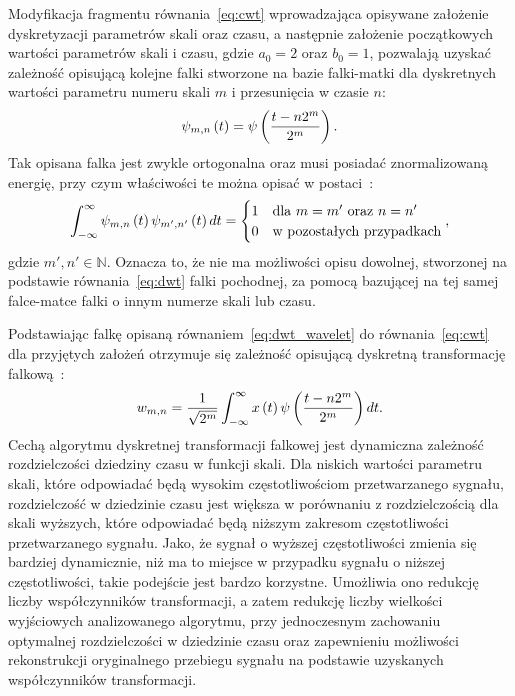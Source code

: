 Modyfikacja fragmentu równania~\eqref{eq:cwt} wprowadzająca opisywane założenie dyskretyzacji parametrów skali oraz czasu, a następnie założenie początkowych wartości parametrów skali i czasu, gdzie $a_{0} = 2$ oraz $b_{0} = 1$, pozwalają uzyskać zależność opisującą kolejne falki stworzone na bazie falki-matki dla dyskretnych wartości parametru numeru skali $m$ i przesunięcia w czasie $n$:
\begin{equation}
\psi_{m,n} \left(t\right) = \psi \left(\frac{t - n 2^{m}}{2^{m}}\right) \label{eq:dwt_wavelet}.
\end{equation}
Tak opisana falka jest zwykle ortogonalna oraz musi posiadać znormalizowaną energię, przy czym właściwości te można opisać w postaci~\cite{wallen_handbook}:
\begin{equation}
\int _{-\infty} ^{\infty} \psi_{m,n} \emb{t} \psi_{m',n'} \emb{t} dt =
\begin{cases}
	1 & $dla $ m = m' $ oraz $ n = n' \\
	0 & $w pozostałych przypadkach$
\end{cases}
\label{eq:dwt_orthogonal_mather},
\end{equation}
gdzie $m', n' \in \mathbb{N}$. Oznacza to, że nie ma możliwości opisu dowolnej, stworzonej na podstawie równania~\eqref{eq:dwt} falki pochodnej, za pomocą bazującej na tej samej falce-matce falki o innym numerze skali lub czasu.

Podstawiając falkę opisaną równaniem~\eqref{eq:dwt_wavelet} do równania~\eqref{eq:cwt} dla przyjętych założeń otrzymuje się zależność opisującą dyskretną transformację falkową~\cite{shensa_dwt}:
\begin{equation}
w_{m,n} = \frac{1}{\sqrt{2^{m}}} \int _{-\infty} ^{\infty} x \left(t\right) \psi \left(\frac{t - n 2^{m}}{2^{m}}\right) dt \label{eq:dwt}.
\end{equation}
Cechą algorytmu dyskretnej transformacji falkowej jest dynamiczna zależność rozdzielczości dziedziny czasu w funkcji skali. Dla niskich wartości parametru skali, które odpowiadać będą wysokim częstotliwościom przetwarzanego sygnału, rozdzielczość w dziedzinie czasu jest większa w porównaniu z rozdzielczością dla skali wyższych, które odpowiadać będą niższym zakresom częstotliwości przetwarzanego sygnału. Jako, że sygnał o wyższej częstotliwości zmienia się bardziej dynamicznie, niż ma to miejsce w przypadku sygnału o niższej częstotliwości, takie podejście jest bardzo korzystne. Umożliwia ono redukcję liczby współczynników transformacji, a zatem redukcję liczby wielkości wyjściowych analizowanego algorytmu, przy jednoczesnym zachowaniu optymalnej rozdzielczości w dziedzinie czasu oraz zapewnieniu możliwości rekonstrukcji oryginalnego przebiegu sygnału na podstawie uzyskanych współczynników transformacji.

